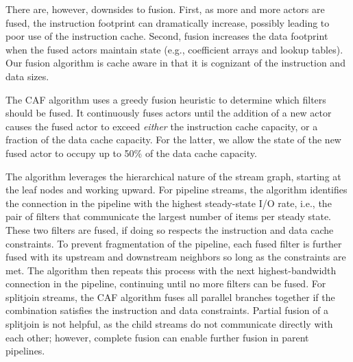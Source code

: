 There are, however, downsides to fusion. First, as more and more
actors are fused, the instruction footprint can dramatically increase,
possibly leading to poor use of the instruction cache. Second, fusion
increases the data footprint when the fused actors maintain state
(e.g., coefficient arrays and lookup tables). Our fusion algorithm is
cache aware in that it is cognizant of the instruction and data sizes.

The CAF algorithm uses a greedy fusion heuristic to determine which filters
should be fused. It continuously fuses actors until the addition of
a new actor causes the fused actor to exceed {\it either} the instruction cache
capacity, or a fraction of the data cache capacity. For the latter, we
allow the state of the new fused actor to occupy up to 50\% of the
data cache capacity.

The algorithm leverages the hierarchical nature of the stream graph,
starting at the leaf nodes and working upward.  For pipeline streams,
the algorithm identifies the connection in the pipeline with the
highest steady-state I/O rate, i.e., the pair of filters that
communicate the largest number of items per steady state.  These two filters
are fused, if doing so respects the instruction and data cache constraints.
To prevent fragmentation of the pipeline, each fused filter is further
fused with its upstream and downstream neighbors so long as the
constraints are met.  The algorithm then repeats this process with the
next highest-bandwidth connection in the pipeline, continuing until no
more filters can be fused.  For splitjoin streams, the CAF algorithm
fuses all parallel branches together if the combination satisfies the
instruction and data constraints.  Partial fusion of a splitjoin is
not helpful, as the child streams do not communicate directly with
each other; however, complete fusion can enable further fusion in
parent pipelines.



